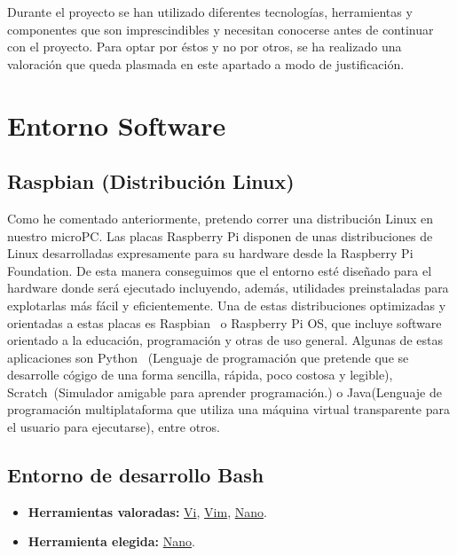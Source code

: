 
Durante el proyecto se han utilizado diferentes tecnologías, herramientas y componentes que son imprescindibles y necesitan conocerse antes de continuar con el proyecto. Para optar por éstos y no por otros, se ha realizado una valoración que queda plasmada en este apartado a modo de justificación.

\section{Entorno Software}
\subsection{Raspbian (Distribución Linux)}\label{4:RaspbianOS}
Como he comentado anteriormente, pretendo correr una distribución Linux en nuestro microPC. Las placas Raspberry Pi disponen de unas distribuciones de Linux desarrolladas expresamente para su hardware desde la Raspberry Pi Foundation. De esta manera conseguimos que el entorno esté diseñado para el hardware donde será ejecutado incluyendo, además, utilidades preinstaladas para explotarlas más fácil y eficientemente. Una de estas distribuciones optimizadas y orientadas a estas placas es Raspbian~\cite{misc:RbPWeb} o Raspberry Pi OS, que incluye software orientado a la educación, programación y otras de uso general. Algunas de estas aplicaciones son Python~\cite{misc:Python} (Lenguaje de programación que pretende que se desarrolle cógigo de una forma sencilla, rápida, poco costosa y legible), Scratch~\cite{misc:Scratch}(Simulador amigable para aprender programación.) o Java\cite{misc:Java}(Lenguaje de programación multiplataforma que utiliza una máquina virtual transparente para el usuario para ejecutarse), entre otros.

\subsection{Entorno de desarrollo Bash}\label{4:BASH}
\begin{itemize}
    \item \textbf{Herramientas valoradas:} \href{https://www.freebsd.org/cgi/man.cgi?query=vi&sektion=1}{Vi}, \href{https://www.vim.org/}{Vim}, \href{https://www.nano-editor.org/}{Nano}.
    \item \textbf{Herramienta elegida:} \href{https://www.nano-editor.org/}{Nano}.
\end{itemize}


